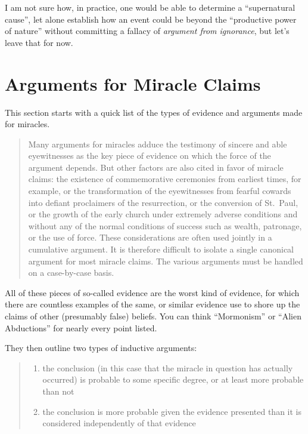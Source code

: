 I am not sure how, in practice, one would be able to determine a
``supernatural cause'', let alone establish how an event could be beyond
the ``productive power of nature'' without committing a fallacy of
\emph{argument from ignorance}, but let's leave that for now.

\section{Arguments for Miracle
Claims}\label{arguments-for-miracle-claims}

This section starts with a quick list of the types of evidence and
arguments made for miracles.

\begin{quote}
Many arguments for miracles adduce the testimony of sincere and able
eyewitnesses as the key piece of evidence on which the force of the
argument depends. But other factors are also cited in favor of miracle
claims: the existence of commemorative ceremonies from earliest times,
for example, or the transformation of the eyewitnesses from fearful
cowards into defiant proclaimers of the resurrection, or the conversion
of St.~Paul, or the growth of the early church under extremely adverse
conditions and without any of the normal conditions of success such as
wealth, patronage, or the use of force. These considerations are often
used jointly in a cumulative argument. It is therefore difficult to
isolate a single canonical argument for most miracle claims. The various
arguments must be handled on a case-by-case basis.
\end{quote}

All of these pieces of so-called evidence are the worst kind of
evidence, for which there are countless examples of the same, or similar
evidence use to shore up the claims of other (presumably false) beliefs.
You can think ``Mormonism'' or ``Alien Abductions'' for nearly every
point listed.

They then outline two types of inductive arguments:

\begin{quote}
\begin{enumerate}
\def\labelenumi{\arabic{enumi}.}
\itemsep1pt\parskip0pt
\item
  the conclusion (in this case that the miracle in question has actually
  occurred) is probable to some specific degree, or at least more
  probable than not
\item
  the conclusion is more probable given the evidence presented than it
  is considered independently of that evidence
\end{enumerate}
\end{quote}

